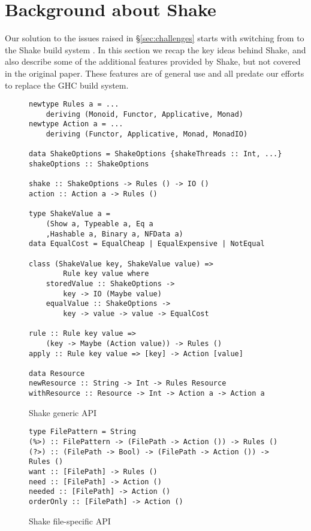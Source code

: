 \section{Background about Shake\label{sec:shake}}

Our solution to the issues raised in \S\ref{sec:challenges} starts with switching from \make{} to the Shake build system \cite{shake}. In this section we recap the key ideas behind Shake, and also describe some of the additional features provided by Shake, but not covered in the original paper. These features are of general use and all predate our efforts to replace the GHC build system.

\begin{figure}
\begin{lstlisting}
newtype Rules a = ...
    deriving (Monoid, Functor, Applicative, Monad)
newtype Action a = ...
    deriving (Functor, Applicative, Monad, MonadIO)

data ShakeOptions = ShakeOptions {shakeThreads :: Int, ...}
shakeOptions :: ShakeOptions

shake :: ShakeOptions -> Rules () -> IO ()
action :: Action a -> Rules ()

type ShakeValue a =
    (Show a, Typeable a, Eq a
    ,Hashable a, Binary a, NFData a)
data EqualCost = EqualCheap | EqualExpensive | NotEqual

class (ShakeValue key, ShakeValue value) =>
        Rule key value where
    storedValue :: ShakeOptions ->
        key -> IO (Maybe value)
    equalValue :: ShakeOptions ->
        key -> value -> value -> EqualCost

rule :: Rule key value =>
    (key -> Maybe (Action value)) -> Rules ()
apply :: Rule key value => [key] -> Action [value]

data Resource
newResource :: String -> Int -> Rules Resource
withResource :: Resource -> Int -> Action a -> Action a
\end{lstlisting}
\caption{Shake generic API\label{fig:shake_generic_api}}
\end{figure}

\begin{figure}
\begin{lstlisting}
type FilePattern = String
(%>) :: FilePattern -> (FilePath -> Action ()) -> Rules ()
(?>) :: (FilePath -> Bool) -> (FilePath -> Action ()) -> Rules ()
want :: [FilePath] -> Rules ()
need :: [FilePath] -> Action ()
needed :: [FilePath] -> Action ()
orderOnly :: [FilePath] -> Action ()
\end{lstlisting}
\caption{Shake file-specific API\label{fig:shake_file_api}}
\end{figure}

